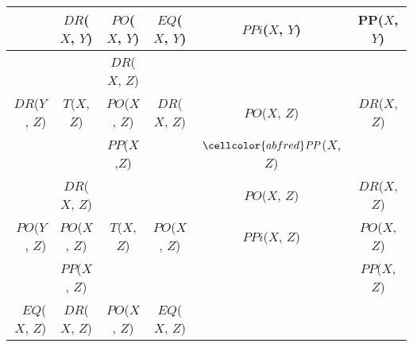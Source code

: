 \begin{table}[t]
\centering
\begin{adjustbox}{width=\textwidth}
\begin{tabular}{r||c|c|c|c|c} 
& $\mathit{DR}$($\mathit{X}$, $\mathit{Y}$) & $\mathit{PO}$($\mathit{X}$,
	$\mathit{Y}$)& $\mathit{EQ}$($\mathit{X}$, $\mathit{Y}$) &
	$\mathit{PPi}$($\mathit{X}$, $\mathit{Y}$) & PP($\mathit{X}$,
	$\mathit{Y}$) \\
\hline
\hline
 \multirow{3}{*}{$\mathit{DR}$($\mathit{Y}$, $\mathit{Z}$)} &
	\cellcolor{abfred} &
	\cellcolor{abfred}$\mathit{DR}$($\mathit{X}$, $\mathit{Z}$) &
	 \cellcolor{abfred} &
	\cellcolor{abfred} &
	\cellcolor{abfred}\multirow{3}{*}{$\mathit{DR}$($\mathit{X}$, $\mathit{Z}$)} \\
& \cellcolor{abfred}$\mathit{T}$($\mathit{X}$, $\mathit{Z}$)&
	\cellcolor{abfred}$\mathit{PO}$($\mathit{X}$, $\mathit{Z}$) &
	\cellcolor{abfred}$\mathit{DR}$($\mathit{X}$, $\mathit{Z}$)&
	\cellcolor{abfred}$\mathit{PO}$($\mathit{X}$, $\mathit{Z}$) &
	\cellcolor{abfred}$\mathit{DR}$($\mathit{X}$, $\mathit{Z}$)\\
 & \cellcolor{abfred}& 
	\cellcolor{abfred}$\mathit{PP}$($\mathit{X}$,$\mathit{Z}$) & 
	\cellcolor{abfred} &
	$\cellcolor{abfred}\mathit{PP}$($\mathit{X}$, $\mathit{Z}$)
	&\cellcolor{abfred}  \\
\hline
 \multirow{3}{*}{$\mathit{PO}$($\mathit{Y}$, $\mathit{Z}$)} &
	\cellcolor{abfred}$\mathit{DR}$($\mathit{X}$, $\mathit{Z}$) &
	\cellcolor{abforange} & 
	\cellcolor{abforange} &
	\cellcolor{abforange}$\mathit{PO}$($\mathit{X}$, $\mathit{Z}$) & 
	\cellcolor{abfred}$\mathit{DR}$($\mathit{X}$, $\mathit{Z}$) \\
 & \cellcolor{abfred}$\mathit{PO}$($\mathit{X}$, $\mathit{Z}$) & 
	\cellcolor{abforange} $\mathit{T}$($\mathit{X}$,$\mathit{Z}$) & 
	\cellcolor{abforange} $\mathit{PO}$($\mathit{X}$, $\mathit{Z}$)& 
	\cellcolor{abforange}$\mathit{PPi}$($\mathit{X}$, $\mathit{Z}$) & 
	\cellcolor{abfred}$\mathit{PO}$($\mathit{X}$, $\mathit{Z}$) \\
 & \cellcolor{abfred}$\mathit{PP}$($\mathit{X}$, $\mathit{Z}$) &
	\cellcolor{abforange} & 
	\cellcolor{abforange}& 
	\cellcolor{abforange}&
	\cellcolor{abfred}$\mathit{PP}$($\mathit{X}$, $\mathit{Z}$) \\
\hline
	$\mathit{EQ}$($\mathit{X}$, $\mathit{Z}$) & 
	\cellcolor{abfred}$\mathit{DR}$($\mathit{X}$, $\mathit{Z}$) & 
	\cellcolor{abforange} $\mathit{PO}$($\mathit{X}$, $\mathit{Z}$) & 
	\cellcolor{abfgreen} $\mathit{EQ}$($\mathit{X}$, $\mathit{Z}$) & 

\end{tabular}
\end{adjustbox}
\end{table}
